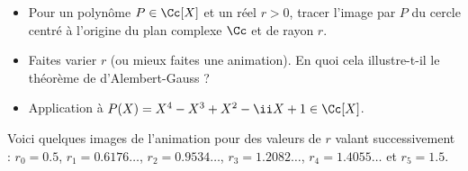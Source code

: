 \documentclass[class=report,crop=false]{standalone}
\begin{document}
\begin{tp}
\sauteligne
\begin{itemize}
  \item Pour un polynôme $P \in \Cc[X]$ et un réel $r>0$, tracer l'image par $P$ du cercle 
centré à l'origine du plan complexe $\Cc$ et de rayon $r$.
  
  \item Faites varier $r$ (ou mieux faites une animation). 
  En quoi cela illustre-t-il le théorème de d'Alembert-Gauss ?

  
  \item Application à $P(X) = X^4-X^3+X^2-\ii X+1 \in \Cc[X]$.
\end{itemize}
\end{tp}

Voici quelques images de l'animation pour des valeurs de $r$ valant
successivement : $r_0 = 0.5$, $r_1 = 0.6176\ldots$,
$r_2 = 0.9534\ldots$, $r_3 = 1.2082\ldots$, $r_4 = 1.4055\ldots$ et $r_5 = 1.5$.
\end{document}
